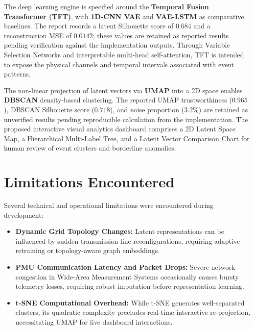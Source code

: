 \documentclass[12pt,a4paper]{report}
\begin{document}
The deep learning engine is specified around the \textbf{Temporal Fusion Transformer (TFT)}, with \textbf{1D-CNN VAE} and \textbf{VAE-LSTM} as comparative baselines. The report records a latent Silhouette score of $0.684$ and a reconstruction MSE of $0.0142$; these values are retained as reported results pending verification against the implementation outputs. Through Variable Selection Networks and interpretable multi-head self-attention, TFT is intended to expose the physical channels and temporal intervals associated with event patterns.

The non-linear projection of latent vectors via \textbf{UMAP} into a 2D space enables \textbf{DBSCAN} density-based clustering. The reported UMAP trustworthiness ($0.965$), DBSCAN Silhouette score ($0.718$), and noise proportion ($3.2\%$) are retained as unverified results pending reproducible calculation from the implementation. The proposed interactive visual analytics dashboard comprises a 2D Latent Space Map, a Hierarchical Multi-Label Tree, and a Latent Vector Comparison Chart for human review of event clusters and borderline anomalies.

\section{Limitations Encountered}
Several technical and operational limitations were encountered during development:
\begin{itemize}
    \item \textbf{Dynamic Grid Topology Changes:} Latent representations can be influenced by sudden transmission line reconfigurations, requiring adaptive retraining or topology-aware graph embeddings.
    \item \textbf{PMU Communication Latency and Packet Drops:} Severe network congestion in Wide-Area Measurement Systems occasionally causes bursty telemetry losses, requiring robust imputation before representation learning.
    \item \textbf{t-SNE Computational Overhead:} While t-SNE generates well-separated clusters, its quadratic complexity precludes real-time interactive re-projection, necessitating UMAP for live dashboard interactions.
\end{itemize}
\end{document}
